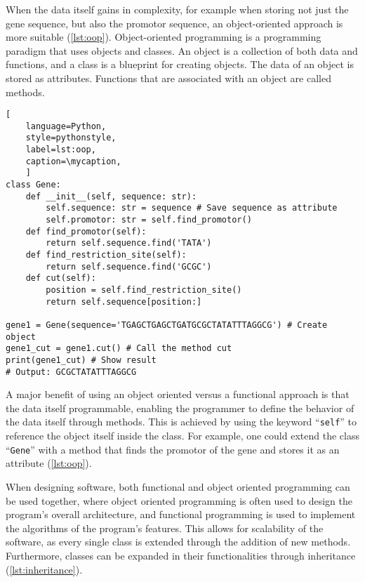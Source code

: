 When the data itself gains in complexity, for example when storing not just the
gene sequence, but also the promotor sequence, an object-oriented approach is
more suitable (\autoref{lst:oop}). Object-oriented programming is a programming
paradigm that uses objects and classes. An object is a collection of both data
and functions, and a class is a blueprint for creating objects. The data of an
object is stored as attributes. Functions that are associated with an object are
called methods.

\def\mycaption{ Example of object oriented programming in python. The class is
    called ``\texttt{Gene}'' and has four methods, ``\texttt{\_\_init\_\_}'',
    ``\texttt{find\_promotor}'', ``\texttt{find\_restriction\_site}'' and
    ``\texttt{cut}''. The method ``\texttt{\_\_init\_\_}'' is called when
    creating (``initializing'') an object, which fills the object with
    user-defined data. The parameter ``\texttt{self}'' is used to reference the
    object itself internally. ``\texttt{find\_promotor}'' is a
    method that finds the position of the promotor in the gene and is called
    during object initialization. }
\begin{lstlisting}[
    language=Python,
    style=pythonstyle,
    label=lst:oop,
    caption=\mycaption,
    ]
class Gene:
    def __init__(self, sequence: str):
        self.sequence: str = sequence # Save sequence as attribute
        self.promotor: str = self.find_promotor() 
    def find_promotor(self):
        return self.sequence.find('TATA')
    def find_restriction_site(self):
        return self.sequence.find('GCGC')
    def cut(self):
        position = self.find_restriction_site()
        return self.sequence[position:]

gene1 = Gene(sequence='TGAGCTGAGCTGATGCGCTATATTTAGGCG') # Create object
gene1_cut = gene1.cut() # Call the method cut
print(gene1_cut) # Show result
# Output: GCGCTATATTTAGGCG
\end{lstlisting}

A major benefit of using an object oriented versus a functional approach is that
the data itself programmable, enabling the programmer to define the behavior of
the data itself through methods. This is achieved by using the keyword
``\texttt{self}'' to reference the object itself inside the class. For example,
one could extend the class ``\texttt{Gene}'' with a method that finds the
promotor of the gene and stores it as an attribute (\autoref{lst:oop}).

When designing software, both functional and object oriented programming can be
used together, where object oriented programming is often used to design the
program's overall architecture, and functional programming is used to implement
the algorithms of the program's features. This allows for scalability of the
software, as every single class is extended through the addition of new methods.
Furthermore, classes can be expanded in their functionalities through
inheritance (\autoref{lst:inheritance}).


